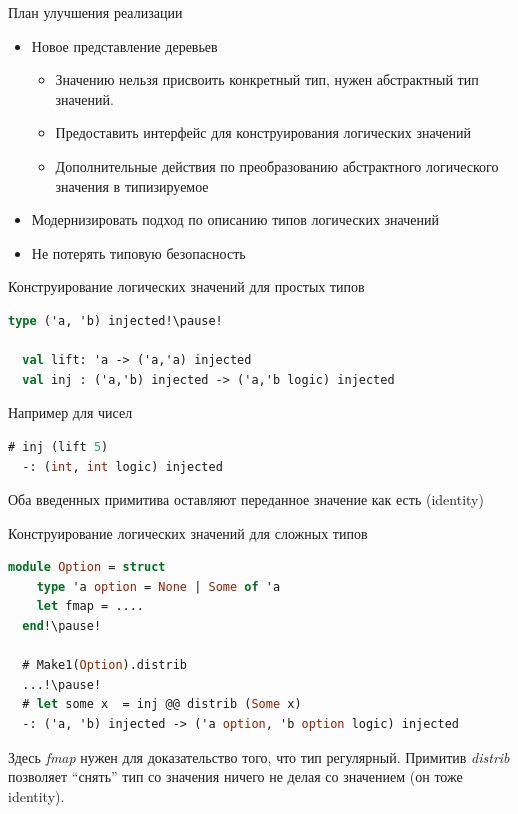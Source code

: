 \documentclass[10pt, mathserif]{beamer}
\let\\\tabularnewline
\let\\\tabularnewline
\theoremstyle{definition}
\begin{document}
\begin{frame}[fragile]{План улучшения реализации}
  \begin{itemize}
  \item Новое представление деревьев
    \begin{itemize}
      \item{Значению нельзя присвоить конкретный тип, нужен абстрактный тип значений.}
      \item{Предоставить интерфейс для конструирования логических значений}
      \item{Дополнительные действия по преобразованию абстрактного логического значения в типизируемое}
    \end{itemize}
  \item Модернизировать подход по описанию типов логических значений
  \item Не потерять типовую безопасность
  \end{itemize}
\end{frame}

\begin{frame}[fragile]{Конструирование логических значений для простых типов}
  \begin{lstlisting}[language=ml]
  type ('a, 'b) injected!\pause!

  val lift: 'a -> ('a,'a) injected
  val inj : ('a,'b) injected -> ('a,'b logic) injected
  \end{lstlisting}
  \pause
  Например для чисел
  \begin{lstlisting}[language=ml]
  # inj (lift 5)
  -: (int, int logic) injected
  \end{lstlisting}
  \pause
  Оба введенных примитива оставляют переданное значение как есть (identity)
\end{frame}

\begin{frame}[fragile]{Конструирование логических значений для сложных типов}
  \begin{lstlisting}[language=ml]
  module Option = struct
    type 'a option = None | Some of 'a
    let fmap = ....
  end!\pause!

  # Make1(Option).distrib
  ...!\pause!
  # let some x  = inj @@ distrib (Some x)
  -: ('a, 'b) injected -> ('a option, 'b option logic) injected
  \end{lstlisting}
  \pause

  Здесь \emph{fmap} нужен для доказательство того, что тип регулярный.\pause\\
  Примитив \emph{distrib} позволяет ``снять'' тип со значения ничего не делая со
  значением (он тоже identity).

\end{frame}
\end{document}
